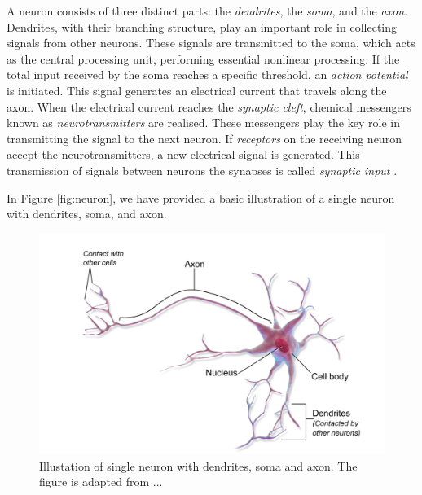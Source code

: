 \documentclass[a4paper, UKenglish, 11pt]{uiomaster}
\begin{document}
A neuron consists of three distinct parts: the \emph{dendrites}, the \emph{soma}, and the \emph{axon}. Dendrites, with their branching structure, play an important role in collecting signals from other neurons. These signals are transmitted to the soma, which acts as the central processing unit, performing essential nonlinear processing. If the total input received by the soma reaches a specific threshold, an \emph{action potential} is initiated. This signal generates an electrical current that travels along the axon. When the electrical current reaches the \emph{synaptic cleft}, chemical messengers known as \emph{neurotransmitters} are realised. These messengers play the key role in transmitting the signal to the next neuron. If \emph{receptors} on the receiving neuron accept the neurotransmitters, a new electrical signal is generated. This transmission of signals between neurons the synapses is called \emph{synaptic input} \cite{gerstner2014neuronal}.

In Figure \ref{fig:neuron}, we have provided a basic illustration of a single neuron with dendrites, soma, and axon.

\begin{figure}
    \centering
    \includegraphics[width=1.0\linewidth]{figures/neuron.pdf}
    \caption{Illustation of single neuron with dendrites, soma and axon. The figure is adapted from ... }
    \label{fig:action_potential}
\end{figure}


\end{document}

